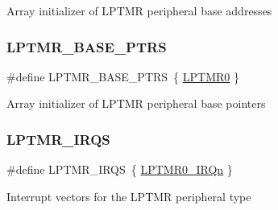 Array initializer of L\+P\+T\+MR peripheral base addresses \mbox{\label{group___l_p_t_m_r___peripheral___access___layer_gac92660dedc63be48d689d43efc9f2c82}} 
\subsubsection{\texorpdfstring{LPTMR\_BASE\_PTRS}{LPTMR\_BASE\_PTRS}}
{\footnotesize\ttfamily \#define L\+P\+T\+M\+R\+\_\+\+B\+A\+S\+E\+\_\+\+P\+T\+RS~\{ \mbox{\hyperlink{group___l_p_t_m_r___peripheral___access___layer_gaba0c3bc8a32ad5a884c99e019dbdef85}{L\+P\+T\+M\+R0}} \}}

Array initializer of L\+P\+T\+MR peripheral base pointers \mbox{\label{group___l_p_t_m_r___peripheral___access___layer_ga5bf0032641d320fc7d486d703800c729}} 
\subsubsection{\texorpdfstring{LPTMR\_IRQS}{LPTMR\_IRQS}}
{\footnotesize\ttfamily \#define L\+P\+T\+M\+R\+\_\+\+I\+R\+QS~\{ \mbox{\hyperlink{group___interrupt__vector__numbers_gga666eb0caeb12ec0e281415592ae89083a93853a8a41060ac37aa92ae9ee472c6e}{L\+P\+T\+M\+R0\+\_\+\+I\+R\+Qn}} \}}

Interrupt vectors for the L\+P\+T\+MR peripheral type 